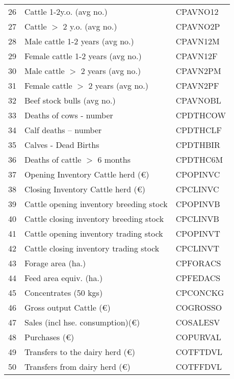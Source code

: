 \documentclass{article}\usepackage{graphicx, color}
\begin{document}
\begin{flushleft}
\begin{table}[ht]
\begin{center}
\begin{tabular}{rll}
  26 & Cattle 1-2y.o.        (avg no.) & CPAVNO12 \\ 
  27 & Cattle $>$ 2 y.o.       (avg no.) & CPAVNO2P \\ 
  28 & Male cattle 1-2 years   (avg no.) & CPAVN12M \\ 
  29 & Female cattle 1-2 years (avg no.) & CPAVN12F \\ 
  30 & Male cattle   $>$ 2 years (avg no.) & CPAVN2PM \\ 
  31 & Female cattle $>$ 2 years (avg no.) & CPAVN2PF \\ 
  32 & Beef stock bulls        (avg no.) & CPAVNOBL \\ 
  33 & Deaths of cows - number & CPDTHCOW \\ 
  34 & Calf deaths -- number & CPDTHCLF \\ 
  35 & Calves - Dead Births & CPDTHBIR \\ 
  36 & Deaths of cattle $>$ 6 months & CPDTHC6M \\ 
  37 & Opening Inventory Cattle herd (€) & CPOPINVC \\ 
  38 & Closing Inventory Cattle herd (€) & CPCLINVC \\ 
  39 & Cattle opening inventory breeding stock & CPOPINVB \\ 
  40 & Cattle closing inventory breeding stock & CPCLINVB \\ 
  41 & Cattle opening inventory trading stock & CPOPINVT \\ 
  42 & Cattle closing inventory trading stock & CPCLINVT \\ 
  43 & Forage area (ha.) & CPFORACS \\ 
  44 & Feed area equiv. (ha.) & CPFEDACS \\ 
  45 & Concentrates   (50 kgs) & CPCONCKG \\ 
  46 & Gross output Cattle         (€) & COGROSSO \\ 
  47 & Sales (incl hse. consumption)(€) & COSALESV \\ 
  48 & Purchases                   (€) & COPURVAL \\ 
  49 & Transfers to the dairy herd (€) & COTFTDVL \\ 
  50 & Transfers from dairy herd   (€) & COTFFDVL \\ 
   \hline
\end{tabular}
\end{center}
\end{table}



\end{flushleft}
\end{document}
